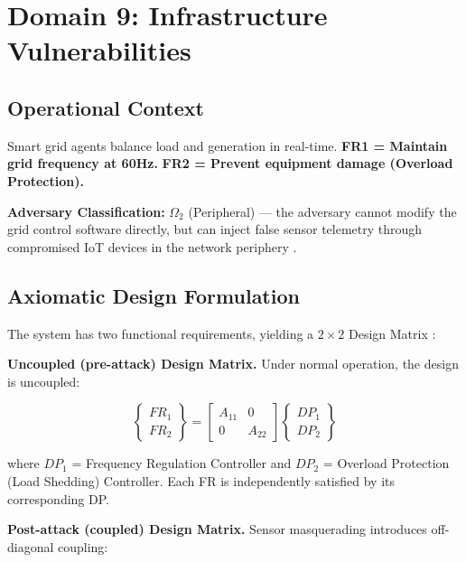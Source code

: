 \documentclass[
]{article}
\begin{document}
\newpage

\section{Domain 9: Infrastructure
Vulnerabilities}\label{sec:domain_infrastructure}

\subsection{Operational Context}\label{operational-context-8}

Smart grid agents balance load and generation in real-time. \textbf{FR1
= Maintain grid frequency at 60Hz.} \textbf{FR2 = Prevent equipment
damage (Overload Protection).}

\textbf{Adversary Classification:} \(\Omega_2\) (Peripheral) --- the
adversary cannot modify the grid control software directly, but can
inject false sensor telemetry through compromised IoT devices in the
network periphery \cite{friedman2026cogsec1}.

\subsection{Axiomatic Design
Formulation}\label{axiomatic-design-formulation-1}

The system has two functional requirements, yielding a \(2 \times 2\)
Design Matrix \cite{suh2001axiomatic}:

\textbf{Uncoupled (pre-attack) Design Matrix.} Under normal operation,
the design is uncoupled:

\begin{equation}
\begin{Bmatrix} FR_1 \\ FR_2 \end{Bmatrix} = \begin{bmatrix} A_{11} & 0 \\ 0 & A_{22} \end{bmatrix} \begin{Bmatrix} DP_1 \\ DP_2 \end{Bmatrix}
\label{eq:infrastructure_baseline}
\end{equation}

where \(DP_1\) = Frequency Regulation Controller and \(DP_2\) = Overload
Protection (Load Shedding) Controller. Each FR is independently
satisfied by its corresponding DP.

\textbf{Post-attack (coupled) Design Matrix.} Sensor masquerading
introduces off-diagonal coupling:
\end{document}
